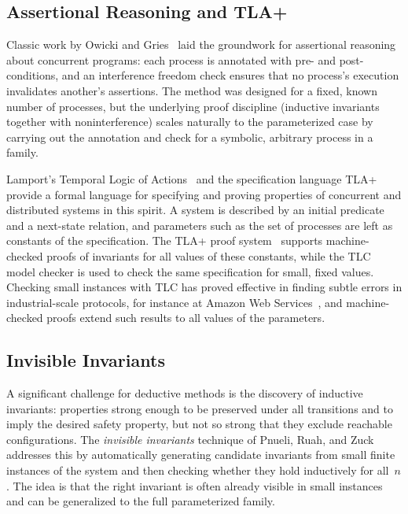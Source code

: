 \subsection{Assertional Reasoning and TLA+}

Classic work by Owicki and Gries~\cite{OG76} laid the groundwork for
assertional reasoning about concurrent programs: each process is annotated
with pre- and post-conditions, and an interference freedom check ensures that
no process's execution invalidates another's assertions. The method was
designed for a fixed, known number of processes, but the underlying proof
discipline (inductive invariants together with noninterference) scales
naturally to the parameterized case by carrying out the annotation and check for a
symbolic, arbitrary process in a family.

Lamport's Temporal Logic of Actions~\cite{Lam94} and the specification
language TLA+~\cite{Lam02} provide a formal language for specifying and proving
properties of concurrent and distributed systems in this spirit. A system is
described by an initial predicate and a next-state relation, and parameters
such as the set of processes are left as constants of the specification. The
TLA+ proof system~\cite{CDLMRV12} supports machine-checked proofs of
invariants for all values of these constants, while the TLC model checker is
used to check the same specification for small, fixed values. Checking small
instances with TLC has proved effective in finding subtle errors in
industrial-scale protocols, for instance at Amazon Web
Services~\cite{NRZBMD15}, and machine-checked proofs extend such results to
all values of the parameters.

\subsection{Invisible Invariants}

A significant challenge for deductive methods is the discovery of inductive
invariants: properties strong enough to be preserved under all transitions and
to imply the desired safety property, but not so strong that they exclude
reachable configurations.
The \emph{invisible invariants} technique of Pnueli, Ruah, and
Zuck~\cite{PRZ01,APRXZ01} addresses this by automatically generating candidate
invariants from small finite instances of the system and then checking whether
they hold inductively for all~$n$. The idea is that the right invariant is
often already visible in small instances and can be generalized to the full
parameterized family.

